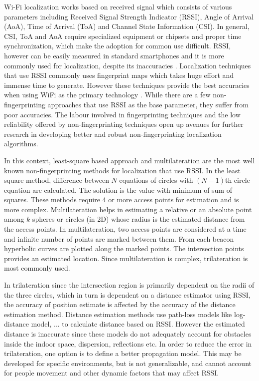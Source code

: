 \documentclass[twocolumn, 11pt]{IEEEtran}
\begin{document}
Wi-Fi localization works based on received signal which consists of various parameters including Received Signal Strength Indicator (RSSI), Angle of Arrival (AoA), Time of Arrival (ToA) and Channel State Information (CSI). In general, CSI, ToA and AoA require specialized equipment or chipsets and proper time synchronization, which make the adoption for common use difficult. RSSI, however can be easily measured in standard smartphones and it is more commonly used for localization, despite its inaccuracies \cite{RSSI Analysis}. Localization techniques that use RSSI commonly uses fingerprint maps which takes huge effort and immense time to generate. However these techniques provide the best accuracies when using WiFi as the primary technology \cite{microsoft competition}. While there are a few non-fingerprinting approaches that use RSSI as the base parameter, they suffer from poor accuracies. The labour involved in fingerprinting techniques and the low reliability offered by non-fingerprinting techniques open up avenues for further research in developing better and robust non-fingerprinting localization algorithms.

In this context, least-square based approach and multilateration are the most well known non-fingerprinting methods for localization that use RSSI. In the least square  method, difference between $N$ equations of circles with $(N-1)$th circle equation are calculated. The solution is the value with minimum of sum of squares. These methods require 4 or more access points for estimation and is more complex. Multilateration helps in estimating a relative or an absolute point among $k$ spheres or circles (in 2D) whose radius is the estimated distance from the access points. In multilateration, two access points are considered at a time and infinite number of points are marked between them. From each beacon hyperbolic curves are plotted along the marked points. The intersection points provides an estimated location. Since multilateration is complex, trilateration is most commonly used.

In trilateration since the intersection region is primarily dependent on the radii of the three circles, which in turn is dependent on a distance estimator using  RSSI, the accuracy of position estimate is affected by the accuracy of the distance estimation method. Distance estimation methods use path-loss models like log-distance model, ... to calculate distance based on RSSI. However the estimated distance is inaccurate since these models do not adequately account for obstacles inside the indoor space, dispersion, reflections etc. In order to reduce the error in trilateration, one option is to define a better propagation model. This may be developed for specific environments, but is not generalizable, and cannot account for people movement and other dynamic factors that may affect RSSI.
\end{document}
